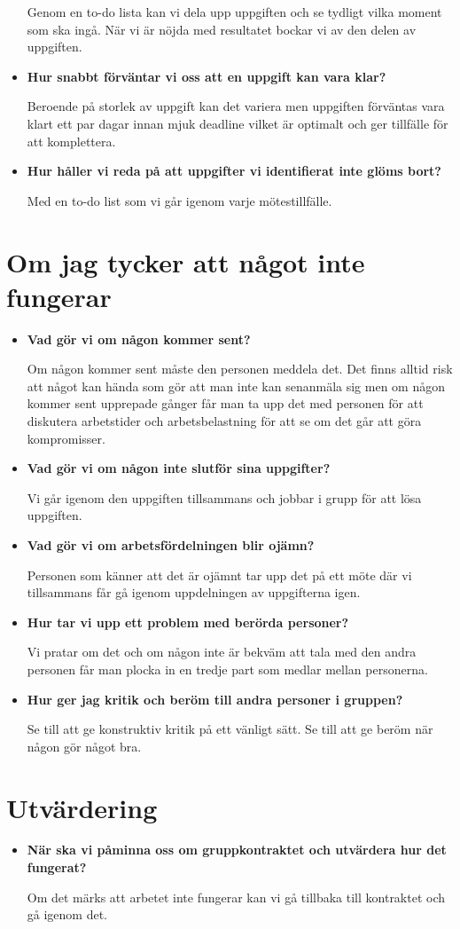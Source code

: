 \documentclass{mall}
\begin{document}
\begin{itemize}
Genom en to-do lista kan vi dela upp uppgiften och se tydligt vilka moment som ska ingå. När vi är nöjda med resultatet bockar vi av den delen av uppgiften.

\item \textbf{Hur snabbt förväntar vi oss att en uppgift kan vara klar?}

Beroende på storlek av uppgift kan det variera men uppgiften förväntas vara klart ett par dagar innan mjuk deadline vilket är optimalt och ger tillfälle för att komplettera.

\item \textbf{Hur håller vi reda på att uppgifter vi identifierat inte glöms bort?}

Med en to-do list som vi går igenom varje mötestillfälle.

\end{itemize}

\section{Om jag tycker att något inte fungerar}

\begin{itemize}
\item \textbf{Vad gör vi om någon kommer sent?}

Om någon kommer sent måste den personen meddela det. Det finns alltid risk att något kan hända som gör att man inte kan senanmäla sig men om någon kommer sent upprepade gånger får man ta upp det med personen för att diskutera arbetstider och arbetsbelastning för att se om det går att göra kompromisser.

\item \textbf{Vad gör vi om någon inte slutför sina uppgifter?}

Vi går igenom den uppgiften tillsammans och jobbar i grupp för att lösa uppgiften.

\item \textbf{Vad gör vi om arbetsfördelningen blir ojämn?}

Personen som känner att det är ojämnt tar upp det på ett möte där vi tillsammans får gå igenom uppdelningen av uppgifterna igen.

\item \textbf{Hur tar vi upp ett problem med berörda personer?}

Vi pratar om det och om någon inte är bekväm att tala med den andra personen får man plocka in en tredje part som medlar mellan personerna.

\item \textbf{Hur ger jag kritik och beröm till andra personer i gruppen?}

Se till att ge konstruktiv kritik på ett vänligt sätt. Se till att ge beröm när någon gör något bra.

\end{itemize}

\section{Utvärdering}


\begin{itemize}
\item \textbf{När ska vi påminna oss om gruppkontraktet och utvärdera hur det fungerat?}

Om det märks att arbetet inte fungerar kan vi gå tillbaka till kontraktet och gå igenom det.

\end{itemize}
\end{document}
